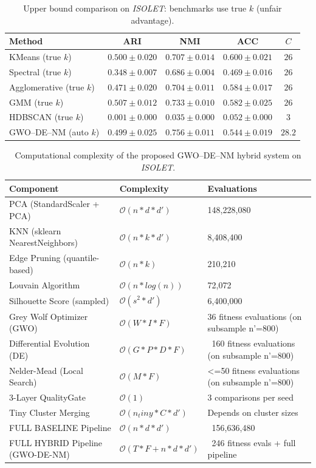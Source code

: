 \begin{table}[htbp]
\centering\small
\caption{Upper bound comparison on \textit{ISOLET}: benchmarks use true $k$ (unfair advantage).}
\label{tab:upper_isolet}
\begin{tabular}{lcccc}
\toprule
Method & ARI & NMI & ACC & $C$ \\
\midrule
KMeans (true $k$) & $0.500 \pm 0.020$ & $0.707 \pm 0.014$ & $0.600 \pm 0.021$ & $26$ \\
Spectral (true $k$) & $0.348 \pm 0.007$ & $0.686 \pm 0.004$ & $0.469 \pm 0.016$ & $26$ \\
Agglomerative (true $k$) & $0.471 \pm 0.020$ & $0.704 \pm 0.011$ & $0.584 \pm 0.017$ & $26$ \\
GMM (true $k$) & $0.507 \pm 0.012$ & $0.733 \pm 0.010$ & $0.582 \pm 0.025$ & $26$ \\
HDBSCAN (true $k$) & $0.001 \pm 0.000$ & $0.035 \pm 0.000$ & $0.052 \pm 0.000$ & $3$ \\
\midrule
GWO--DE--NM (auto $k$) & $\mathbf{0.499 \pm 0.025}$ & $\mathbf{0.756 \pm 0.011}$ & $\mathbf{0.544 \pm 0.019}$ & $28.2$ \\
\bottomrule
\end{tabular}
\end{table}

\begin{table}[htbp]
\centering
\small
\caption{Computational complexity of the proposed GWO--DE--NM hybrid system on \textit{ISOLET}.}
\label{tab:complexity_isolet}
\begin{tabular}{lll}
\toprule
Component & Complexity & Evaluations \\
\midrule
PCA (StandardScaler + PCA) & $\mathcal{O}(n * d * d')$ & 148,228,080 \\
KNN (sklearn NearestNeighbors) & $\mathcal{O}(n * k * d')$ & 8,408,400 \\
Edge Pruning (quantile-based) & $\mathcal{O}(n * k)$ & 210,210 \\
Louvain Algorithm & $\mathcal{O}(n * log(n))$ & 72,072 \\
Silhouette Score (sampled) & $\mathcal{O}(s^2 * d')$ & 6,400,000 \\
Grey Wolf Optimizer (GWO) & $\mathcal{O}(W * I * F)$ & 36 fitness evaluations (on subsample n'=800) \\
Differential Evolution (DE) & $\mathcal{O}(G * P * D * F)$ & ~160 fitness evaluations (on subsample n'=800) \\
Nelder-Mead (Local Search) & $\mathcal{O}(M * F)$ & <=50 fitness evaluations (on subsample n'=800) \\
3-Layer QualityGate & $\mathcal{O}(1)$ & 3 comparisons per seed \\
Tiny Cluster Merging & $\mathcal{O}(n_tiny * C * d')$ & Depends on cluster sizes \\
\midrule
FULL BASELINE Pipeline & $\mathcal{O}(n * d * d')$ & ~156,636,480 \\
\midrule
FULL HYBRID Pipeline (GWO-DE-NM) & $\mathcal{O}(T * F + n * d * d')$ & ~246 fitness evals + full pipeline \\
\bottomrule
\end{tabular}
\end{table}